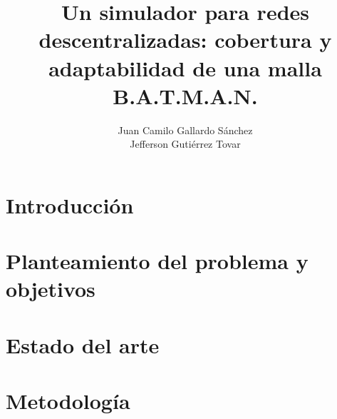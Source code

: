 \documentclass[12pt,openany]{MIA-USA}
\title{Un simulador para redes descentralizadas: cobertura y adaptabilidad de una malla B.A.T.M.A.N.}
\author{Juan Camilo Gallardo Sánchez \\{} Jefferson Gutiérrez Tovar}
\begin{document}
	
	\maketitle
	
	
	
 	
	
    
    \tableofcontents
    \listoffigures
    \listoftables
    
 	
    
    
    
    \chapter{Introducci\'on}
    \label{cap:introduccion}
    
    
    \chapter{Planteamiento del problema y objetivos}
    \label{cap:planteamiento}
    
    
    \chapter{Estado del arte}
    \label{cap:estado-arte}
    
    
    \chapter{Metodolog\'ia}
    \label{cap:metodologia}
    
    
\end{document}
